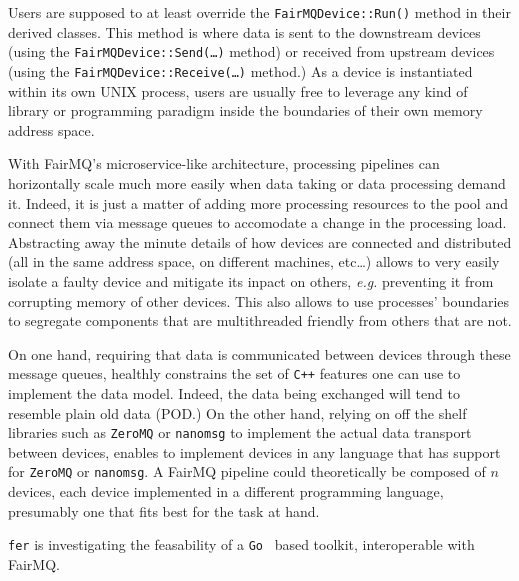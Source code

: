 \documentclass{webofc}
\begin{document}
Users are supposed to at least override the \texttt{FairMQDevice::Run()} method in their derived classes.
This method is where data is sent to the downstream devices (using the \texttt{FairMQDevice::Send(\ldots)} method) or received from upstream devices (using the \texttt{FairMQDevice::Receive(\ldots)} method.)
As a device is instantiated within its own UNIX process, users are usually free to leverage any kind of library or programming paradigm inside the boundaries of their own memory address space.

With FairMQ's microservice-like architecture, processing pipelines can horizontally scale much more easily when data taking or data processing demand it.
Indeed, it is just a matter of adding more processing resources to the pool and connect them via message queues to accomodate a change in the processing load.
Abstracting away the minute details of how devices are connected and distributed (all in the same address space, on different machines, etc\ldots) allows to very easily isolate a faulty device and mitigate its inpact on others, \emph{e.g.} preventing it from corrupting memory of other devices.
This also allows to use processes' boundaries to segregate components that are multithreaded friendly from others that are not.

On one hand, requiring that data is communicated between devices through these message queues, healthly constrains the set of \texttt{C++} features one can use to implement the data model.
Indeed, the data being exchanged will tend to resemble plain old data (POD.)
On the other hand, relying on off the shelf libraries such as \texttt{ZeroMQ} or \texttt{nanomsg} to implement the actual data transport between devices, enables to implement devices in any language that has support for \texttt{ZeroMQ} or \texttt{nanomsg}.
A FairMQ pipeline could theoretically be composed of $n$ devices, each device implemented in a different programming language, presumably one that fits best for the task at hand.

\texttt{fer} is investigating the feasability of a \texttt{Go}~\cite{ref-golang} based toolkit, interoperable with FairMQ.
\end{document}
